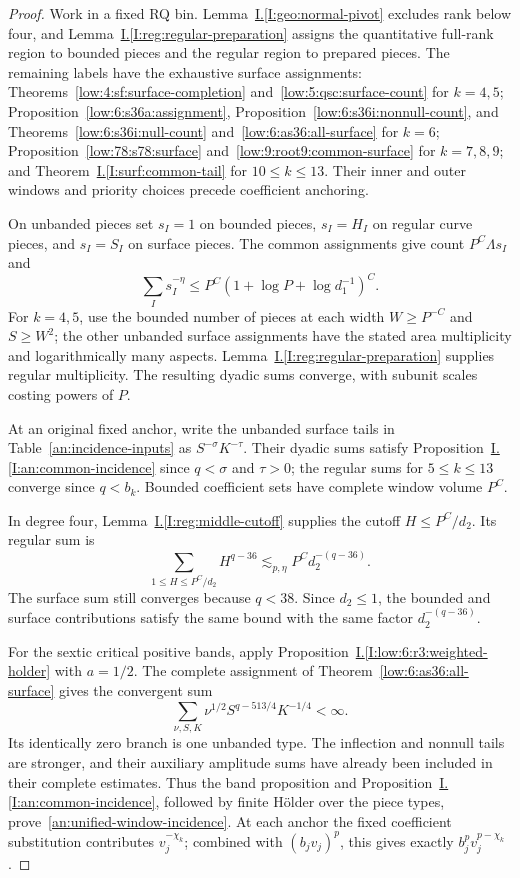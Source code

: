 \documentclass[11pt]{amsart}
\theoremstyle{definition}
\theoremstyle{remark}
\numberwithin{equation}{section}
\newcommand{\partIref}[1]{\hyperref[I:#1]{I.\ref*{I:#1}}}
\begin{document}
\begin{proof}
Work in a fixed RQ bin. Lemma~\partIref{geo:normal-pivot} excludes rank below four, and Lemma~\partIref{reg:regular-preparation} assigns the quantitative full-rank region to bounded pieces and the regular region to prepared pieces. The remaining labels have the exhaustive surface assignments: Theorems~\ref{low:4:sf:surface-completion} and~\ref{low:5:qsc:surface-count} for $k=4,5$; Proposition~\ref{low:6:s36a:assignment}, Proposition~\ref{low:6:s36i:nonnull-count}, and Theorems~\ref{low:6:s36i:null-count} and~\ref{low:6:as36:all-surface} for $k=6$; Proposition~\ref{low:78:s78:surface} and~\eqref{low:9:root9:common-surface} for $k=7,8,9$; and Theorem~\partIref{surf:common-tail} for $10\le k\le13$. Their inner and outer windows and priority choices precede coefficient anchoring.

On unbanded pieces set $s_I=1$ on bounded pieces, $s_I=H_I$ on regular curve pieces, and $s_I=S_I$ on surface pieces. The common assignments give count $P^C\Lambda s_I$ and
\[
\sum_I s_I^{-\eta}\le P^C(1+\log P+\log d_1^{-1})^C.
\]
For $k=4,5$, use the bounded number of pieces at each width $W\ge P^{-C}$ and $S\ge W^2$; the other unbanded surface assignments have the stated area multiplicity and logarithmically many aspects. Lemma~\partIref{reg:regular-preparation} supplies regular multiplicity. The resulting dyadic sums converge, with subunit scales costing powers of $P$.

At an original fixed anchor, write the unbanded surface tails in Table~\ref{an:incidence-inputs} as $S^{-\sigma}K^{-\tau}$. Their dyadic sums satisfy Proposition~\partIref{an:common-incidence} since $q<\sigma$ and $\tau>0$; the regular sums for $5\le k\le13$ converge since $q<b_k$. Bounded coefficient sets have complete window volume $P^C$.

In degree four, Lemma~\partIref{reg:middle-cutoff} supplies the cutoff $H\le P^C/d_2$. Its regular sum is
\begin{equation}\label{an:quartic-paid-sum}
\sum_{1\le H\le P^C/d_2}H^{q-36}\lesssim_{p,\eta} P^Cd_2^{-(q-36)}.
\end{equation}
The surface sum still converges because $q<38$. Since $d_2\le1$, the bounded and surface contributions satisfy the same bound with the same factor $d_2^{-(q-36)}$.

For the sextic critical positive bands, apply Proposition~\partIref{low:6:r3:weighted-holder} with $a=1/2$. The complete assignment of Theorem~\ref{low:6:as36:all-surface} gives the convergent sum
\[
\sum_{\nu,S,K}\nu^{1/2}S^{q-513/4}K^{-1/4}<\infty.
\]
Its identically zero branch is one unbanded type. The inflection and nonnull tails are stronger, and their auxiliary amplitude sums have already been included in their complete estimates. Thus the band proposition and Proposition~\partIref{an:common-incidence}, followed by finite H\"older over the piece types, prove~\eqref{an:unified-window-incidence}. At each anchor the fixed coefficient substitution contributes $v_j^{-\chi_k}$; combined with $(b_jv_j)^p$, this gives exactly $b_j^pv_j^{p-\chi_k}$.


\end{proof}
\end{document}
